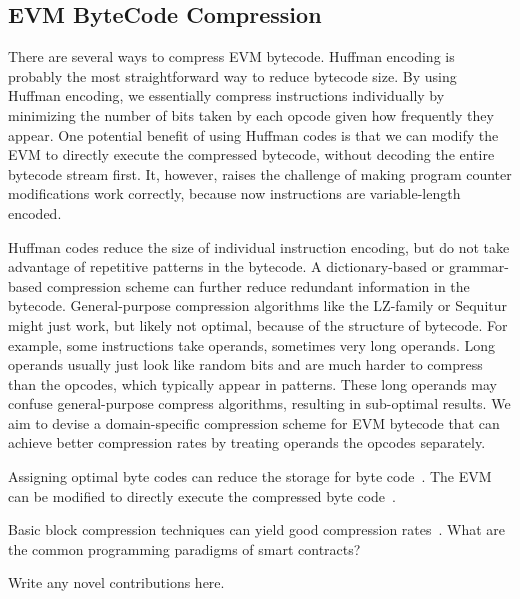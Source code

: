 
\subsection{EVM ByteCode Compression}\label{sec:evmcompress}

There are several ways to compress EVM bytecode. Huffman encoding is probably the most straightforward
way to reduce bytecode size. By using Huffman encoding, we essentially compress instructions individually
by minimizing the number of bits taken by each opcode given how frequently they appear. One potential
benefit of using Huffman codes is that we can modify the EVM to directly execute the compressed bytecode,
without decoding the entire bytecode stream first. It, however, raises the challenge of making program counter modifications work
correctly, because now instructions are variable-length encoded.

Huffman codes reduce the size of individual instruction encoding, but do not take advantage of repetitive patterns in the bytecode.
A dictionary-based or grammar-based compression scheme can further reduce redundant information in the bytecode.
General-purpose compression algorithms like the LZ-family or Sequitur might just work,
but likely not optimal, because of the structure of bytecode.
For example, some instructions take operands, sometimes very long operands.
Long operands usually just look like random bits and are much harder to compress than the opcodes, which typically appear in patterns.
These long operands may confuse general-purpose compress algorithms, resulting in sub-optimal results.
We aim to devise a domain-specific compression scheme for EVM bytecode that can achieve better compression rates
by treating operands the opcodes separately.

Assigning optimal byte codes can reduce the storage for byte code~\cite{aslam2010}.
The EVM can be modified to directly execute the compressed byte code~\cite{marc2003,evans2003}.

Basic block compression techniques can yield good compression rates~\cite{clausen2000}. 
What are the common programming paradigms of smart contracts?

Write any novel contributions here.

